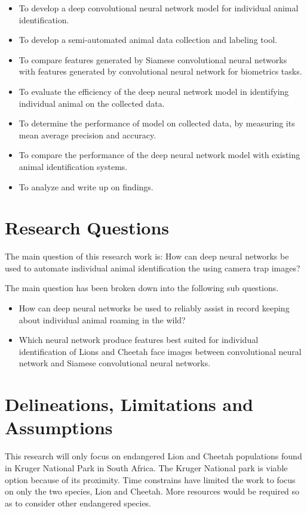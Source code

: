 \begin{itemize}

    \item To develop a deep convolutional neural network model for individual animal identification.
    \item To develop a semi-automated animal data collection and labeling tool.
    \item To compare features generated by Siamese convolutional neural networks with features generated by convolutional neural network for biometrics tasks.   
    \item To evaluate the efficiency of the deep neural network model in identifying individual animal on the collected data.
    \item To determine the performance of model on collected data, by measuring its mean average precision and accuracy. 
    \item To compare the performance of the deep neural network model with existing animal identification systems. 
    \item To analyze and write up on findings.  
\end{itemize}
\section{Research Questions}
The main question of this research work is: 
How can deep neural networks be used to automate individual animal identification the using camera trap images?

The main question has been broken down into the following sub questions.
\begin{itemize}
    \item How can deep neural networks be used to reliably assist in record keeping about individual animal roaming in the wild?
    \item Which neural network produce features best suited for individual identification of Lions and Cheetah face images between convolutional neural network and Siamese convolutional neural networks.      
\end{itemize}

\section{Delineations, Limitations and Assumptions}

This research will only focus on endangered Lion and Cheetah populations found in Kruger National Park in South Africa. The Kruger National park is viable option because of its proximity. Time constrains have limited the work to focus on only the two species, Lion and Cheetah. More resources would be required so as to consider other endangered species.

